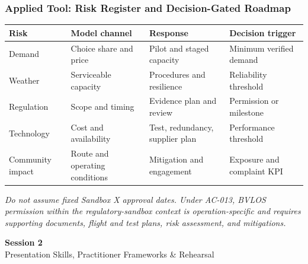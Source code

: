 \documentclass{beamer}
\begin{document}
\begin{frame}[t]
\frametitle{Applied Tool: Risk Register and Decision-Gated Roadmap}

\begin{center}\footnotesize
\setlength{\tabcolsep}{4pt}
\renewcommand{\arraystretch}{1.15}
\begin{tabularx}{\linewidth}{>{\raggedright\arraybackslash}p{1.8cm}|>{\raggedright\arraybackslash}X|>{\raggedright\arraybackslash}X|>{\raggedright\arraybackslash}X}
\textbf{Risk} & \textbf{Model channel} & \textbf{Response} & \textbf{Decision trigger}\\
\hline
Demand & Choice share and price & Pilot and staged capacity & Minimum verified demand\\
Weather & Serviceable capacity & Procedures and resilience & Reliability threshold\\
Regulation & Scope and timing & Evidence plan and review & Permission or milestone\\
Technology & Cost and availability & Test, redundancy, supplier plan & Performance threshold\\
Community impact & Route and operating conditions & Mitigation and engagement & Exposure and complaint KPI\\
\end{tabularx}
\end{center}

\vspace{0.15cm}
\footnotesize
\textit{Do not assume fixed Sandbox X approval dates. Under AC-013, BVLOS permission within the regulatory-sandbox context is operation-specific and requires supporting documents, flight and test plans, risk assessment, and mitigations.}
\end{frame}

\begin{frame}[c]
  \begin{center}
    \huge\color{cuhkpurple}\textbf{Session 2}\\
    \vspace{0.5cm}
    \Large Presentation Skills, Practitioner Frameworks \& Rehearsal
  \end{center}
\end{frame}
\end{document}
